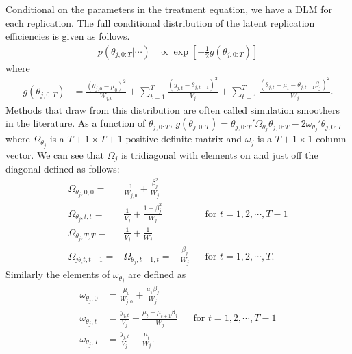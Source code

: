 \documentclass[graybox]{svmult}
\begin{document}
Conditional on the parameters in the treatment equation, we have a DLM for each replication. The full conditional distribution of the latent replication efficiencies is given as follows.
\begin{align*}
p(\theta_{j,0:T}|\cdots)&\propto \exp\left[-\frac{1}{2}g(\theta_{j,0:T})\right]
\end{align*}
where
\begin{align*}
g(\theta_{j,0:T}) &= \frac{(\theta_{j,0} - \mu_0)^2}{W_{j,0}} + \sum_{t=1}^T\frac{(y_{j,t} - \theta_{j,t-1})^2}{V_j} + \sum_{t=1}^T\frac{(\theta_{j,t} - \mu_t - \theta_{j,t-1}\beta_j)^2}{W_j}. 
\end{align*}
Methods that draw from this distribution are often called simulation smoothers in the literature. As a function of $\theta_{j,0:T}$, $g(\theta_{j,0:T}) = \theta_{j,0:T}'\Omega_{\theta_j}\theta_{j,0:T} - 2\omega_{\theta_j}'\theta_{j,0:T}$ where $\Omega_{\theta_j}$ is a $T+1\times T+1$ positive definite matrix and $\omega_j$ is a $T+1\times 1$ column vector. We can see that $\Omega_j$ is tridiagonal with elements on and just off the diagonal defined as follows:
\begin{align*}
\Omega_{\theta_j,0,0}=&\frac{1}{W_{j,0}} + \frac{\beta_j^2}{W_j}&&\\
\Omega_{\theta_j,t,t}=&\frac{1}{V_{j}} + \frac{1 + \beta_j^2}{W_j}&&\mbox{for } t=1,2,\cdots,T-1\\
\Omega_{\theta_j,T,T}=&\frac{1}{V_{j}} + \frac{1}{W_j}&&\\
\Omega_{j\theta_,t,t-1}=&\Omega_{\theta_j,t-1,t}=-\frac{\beta_j}{W_j}&&\mbox{for } t=1,2,\cdots,T.
\end{align*}
Similarly the elements of $\omega_{\theta_j}$ are defined as
\begin{align*}
\omega_{\theta_j,0} &= \frac{\mu_0}{W_{j,0}} + \frac{\mu_1\beta_j}{W_j}&&\\
\omega_{\theta_j,t} &= \frac{y_{j,t}}{V_j} + \frac{\mu_t - \mu_{t+1}\beta_j}{W_j}&&\mbox{for } t=1,2,\cdots,T-1\\
\omega_{\theta_j,T} &= \frac{y_{j,t}}{V_j} + \frac{\mu_t}{W_j}.&&
\end{align*}
\end{document}
